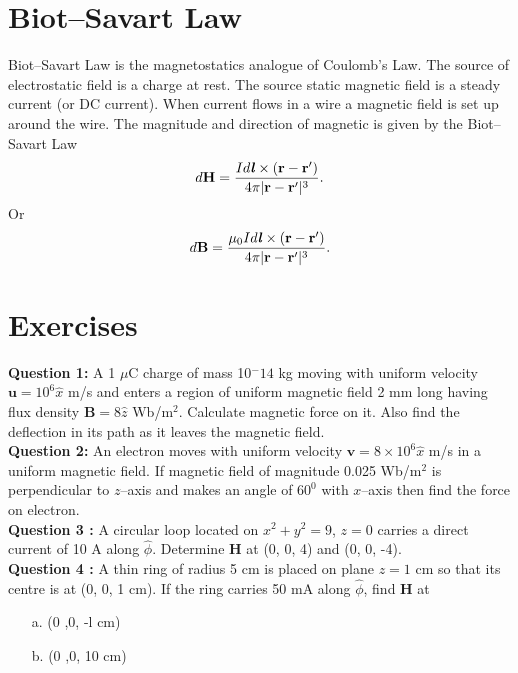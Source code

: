 \documentclass[12pt,a4paper]{article}
\begin{document}
\section{Biot--Savart Law}
Biot--Savart Law is the magnetostatics analogue of Coulomb's Law. The source of electrostatic field is a charge at rest. The source static magnetic field is a steady current (or DC current). When current flows in a wire a magnetic field is set up around the wire. The magnitude and direction of magnetic is given by the Biot--Savart Law
\begin{equation}
d\textbf{H}=\dfrac{Id\textbf{\textit{l}}\times(\textbf{r}-\textbf{r}')}{4\pi|\textbf{r}-\textbf{r}'|^{3}}.
\end{equation}
Or
\begin{equation}
d\textbf{B}=\dfrac{\mu_0Id\textbf{\textit{l}}\times(\textbf{r}-\textbf{r}')}{4\pi|\textbf{r}-\textbf{r}'|^{3}}.
\end{equation}
\section{Exercises}
\noindent\textbf{Question 1:} A 1 $\mu$C charge of mass 10$^-14$ kg moving with uniform velocity $\textbf{u}=10^6\hat x$ m/s and enters a region of uniform magnetic field 2 mm long having flux density $\textbf{B}=8\hat z$ Wb/m$^2$. Calculate magnetic force on it. Also find the deflection in its path as it leaves the magnetic field.\\[0.2cm]
\noindent\textbf{Question 2:} An electron moves with uniform velocity $\textbf{v}=8\times 10^6\hat x$ m/s in a uniform magnetic field. If magnetic field of magnitude 0.025 Wb/m$^2$ is perpendicular to $z$--axis and makes an angle of $60^0$ with $x$--axis then find the force on electron.\\[0.2cm]
\noindent\textbf{Question 3 \cite[Example 7.3, page 270]{Sadiku}:} A circular loop located on $x^2+y^2=9$, $z=0$ carries a direct current of 10 A along $\hat\phi$. Determine \textbf{H} at (0, 0, 4) and (0, 0, -4).\\[0.2cm]
\noindent\textbf{Question 4 \cite[PE 7.3, page 271]{Sadiku}:} A thin ring of radius 5 cm is placed on plane $z=1$ cm so that its centre is at (0, 0, 1 cm). If the ring carries 50 mA along $\hat\phi$, find \textbf{H} at
\begin{itemize}
\item[a.] (0 ,0, -l cm)
\item[b.] (0 ,0, 10 cm)
\end{itemize}


\end{document}
